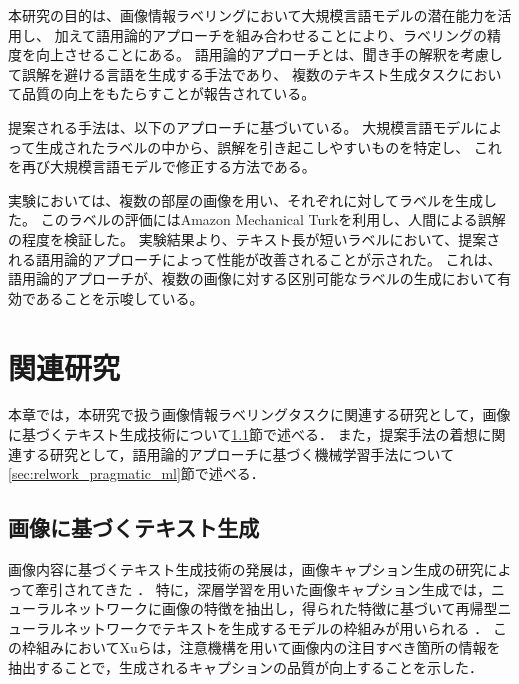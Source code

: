 \documentclass[a4paper,11pt]{jreport}
\begin{document}
本研究の目的は、画像情報ラベリングにおいて大規模言語モデルの潜在能力を活用し、
加えて語用論的アプローチを組み合わせることにより、ラベリングの精度を向上させることにある。
語用論的アプローチとは、聞き手の解釈を考慮して誤解を避ける言語を生成する手法であり、
複数のテキスト生成タスクにおいて品質の向上をもたらすことが報告されている。

提案される手法は、以下のアプローチに基づいている。
大規模言語モデルによって生成されたラベルの中から、誤解を引き起こしやすいものを特定し、
これを再び大規模言語モデルで修正する方法である。

実験においては、複数の部屋の画像を用い、それぞれに対してラベルを生成した。
このラベルの評価にはAmazon Mechanical Turkを利用し、人間による誤解の程度を検証した。
実験結果より、テキスト長が短いラベルにおいて、提案される語用論的アプローチによって性能が改善されることが示された。
これは、語用論的アプローチが、複数の画像に対する区別可能なラベルの生成において有効であることを示唆している。

%



\chapter{関連研究}

本章では，本研究で扱う画像情報ラベリングタスクに関連する研究として，画像に基づくテキスト生成技術について\ref{sec:relwork_image_captioning}節で述べる．
また，提案手法の着想に関連する研究として，語用論的アプローチに基づく機械学習手法について\ref{sec:relwork_pragmatic_ml}節で述べる．

\section{画像に基づくテキスト生成}
\label{sec:relwork_image_captioning}
画像内容に基づくテキスト生成技術の発展は，画像キャプション生成の研究によって牽引されてきた \cite{Farhadi2010}．
特に，深層学習を用いた画像キャプション生成では，ニューラルネットワークに画像の特徴を抽出し，得られた特徴に基づいて再帰型ニューラルネットワークでテキストを生成するモデルの枠組みが用いられる \cite{Vinyals2017}．
この枠組みにおいてXuら\cite{Xu2015}は，注意機構を用いて画像内の注目すべき箇所の情報を抽出することで，生成されるキャプションの品質が向上することを示した．
\end{document}
